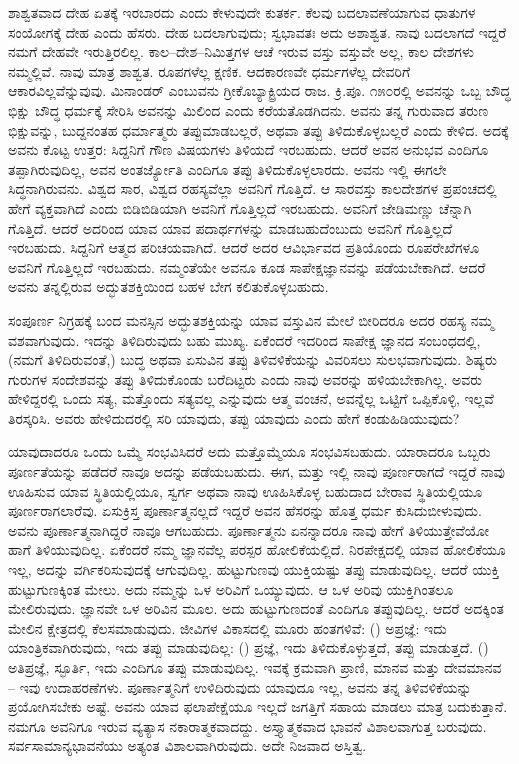 ಶಾಶ್ವತವಾದ ದೇಹ ಏತಕ್ಕೆ ಇರಬಾರದು ಎಂದು ಕೇಳುವುದೇ ಕುತರ್ಕ. ಕೆಲವು ಬದಲಾವಣೆಯಾಗುವ ಧಾತುಗಳ ಸಂಯೋಗಕ್ಕೆ ದೇಹ ಎಂದು ಹೆಸರು. ದೇಹ ಬದಲಾಗುವುದು; ಸ್ವಭಾವತಃ ಅದು ಅಶಾಶ್ವತ. ನಾವು ಬದಲಾಗದೆ ಇದ್ದರೆ ನಮಗೆ ದೇಹವೇ ಇರುತ್ತಿರಲಿಲ್ಲ. ಕಾಲ–ದೇಶ–ನಿಮಿತ್ತಗಳ ಆಚೆ ಇರುವ ವಸ್ತು ವಸ್ತುವೇ ಅಲ್ಲ, ಕಾಲ ದೇಶಗಳು ನಮ್ಮಲ್ಲಿವೆ. ನಾವು ಮಾತ್ರ ಶಾಶ್ವತ. ರೂಪಗಳೆಲ್ಲ ಕ್ಷಣಿಕ. ಆದಕಾರಣವೇ ಧರ್ಮಗಳೆಲ್ಲ ದೇವರಿಗೆ ಆಕಾರವಿಲ್ಲವೆನ್ನುವುವು. ಮಿನಾಂಡರ್ ಎಂಬುವನು ಗ್ರೀಕೊಬ್ಯಾಕ್ಟ್ರಿಯದ ರಾಜ. ಕ್ರಿ.ಪೂ. ೧೫೦ರಲ್ಲಿ ಅವನನ್ನು ಒಬ್ಬ ಬೌದ್ಧ ಭಿಕ್ಷು ಬೌದ್ಧ ಧರ್ಮಕ್ಕೆ ಸೇರಿಸಿ ಅವನನ್ನು ಮಿಲಿಂದ ಎಂದು ಕರೆಯತೊಡಗಿದನು. ಅವನು ತನ್ನ ಗುರುವಾದ ತರುಣ ಭಿಕ್ಷುವನ್ನು, ಬುದ್ದನಂತಹ ಧರ್ಮಾತ್ಮರು ತಪ್ಪುಮಾಡಬಲ್ಲರೆ, ಅಥವಾ ತಪ್ಪು ತಿಳಿದುಕೊಳ್ಳಬಲ್ಲರೆ ಎಂದು ಕೇಳಿದ. ಅದಕ್ಕೆ ಅವನು ಕೊಟ್ಟ ಉತ್ತರ: ಸಿದ್ದನಿಗೆ ಗೌಣ ವಿಷಯಗಳು ತಿಳಿಯದೆ ಇರಬಹುದು. ಆದರೆ ಅವನ ಅನುಭವ ಎಂದಿಗೂ ತಪ್ಪಾಗಿರುವುದಿಲ್ಲ, ಅವನ ಅಂತರ್ಜ್ಯೋತಿ ಎಂದಿಗೂ ತಪ್ಪು ತಿಳಿದುಕೊಳ್ಳಲಾರದು. ಅವನು ಇಲ್ಲಿ ಈಗಲೇ ಸಿದ್ಧನಾಗಿರುವನು. ವಿಶ್ವದ ಸಾರ, ವಿಶ್ವದ ರಹಸ್ಯವೆಲ್ಲಾ ಅವನಿಗೆ ಗೊತ್ತಿದೆ. ಆ ಸಾರವಸ್ತು ಕಾಲದೇಶಗಳ ಪ್ರಪಂಚದಲ್ಲಿ ಹೇಗೆ ವ್ಯಕ್ತವಾಗಿದೆ ಎಂದು ಬಿಡಿಬಿಡಿಯಾಗಿ ಅವನಿಗೆ ಗೊತ್ತಿಲ್ಲದೆ ಇರಬಹುದು. ಅವನಿಗೆ ಜೇಡಿಮಣ್ಣು ಚೆನ್ನಾಗಿ ಗೊತ್ತಿದೆ. ಆದರೆ ಅದರಿಂದ ಯಾವ ಯಾವ ಪದಾರ್ಥಗಳನ್ನು ಮಾಡಬಹುದೆಂಬುದು ಅವನಿಗೆ ಗೊತ್ತಿಲ್ಲದೆ ಇರಬಹುದು. ಸಿದ್ದನಿಗೆ ಆತ್ಮದ ಪರಿಚಯವಾಗಿದೆ. ಆದರೆ ಅದರ ಆವಿರ್ಭಾವದ ಪ್ರತಿಯೊಂದು ರೂಪರೇಖೆಗಳೂ ಅವನಿಗೆ ಗೊತ್ತಿಲ್ಲದೆ ಇರಬಹುದು. ನಮ್ಮಂತೆಯೇ ಅವನೂ ಕೂಡ ಸಾಪೇಕ್ಷಜ್ಞಾನವನ್ನು ಪಡೆಯಬೇಕಾಗಿದೆ. ಆದರೆ ಅವನು ತನ್ನಲ್ಲಿರುವ ಅದ್ಭುತಶಕ್ತಿಯಿಂದ ಬಹಳ ಬೇಗ ಕಲಿತುಕೊಳ್ಳಬಹುದು.

ಸಂಪೂರ್ಣ ನಿಗ್ರಹಕ್ಕೆ ಬಂದ ಮನಸ್ಸಿನ ಅದ್ಭುತಶಕ್ತಿಯನ್ನು ಯಾವ ವಸ್ತುವಿನ ಮೇಲೆ ಬೀರಿದರೂ ಅದರ ರಹಸ್ಯ ನಮ್ಮ ವಶವಾಗುವುದು. ಇದನ್ನು ತಿಳಿದಿರುವುದು ಬಹು ಮುಖ್ಯ. ಏಕೆಂದರೆ ಇದರಿಂದ ಸಾಪೇಕ್ಷ ಜ್ಞಾನದ ಸಂಬಂಧದಲ್ಲಿ, (ನಮಗೆ ತಿಳಿದಿರುವಂತೆ,) ಬುದ್ಧ ಅಥವಾ ಏಸುವಿನ ತಪ್ಪು ತಿಳಿವಳಿಕೆಯನ್ನು ವಿವರಿಸಲು ಸುಲಭವಾಗುವುದು. ಶಿಷ್ಯರು ಗುರುಗಳ ಸಂದೇಶವನ್ನು ತಪ್ಪು ತಿಳಿದುಕೊಂಡು ಬರೆದಿಟ್ಟರು ಎಂದು ನಾವು ಅವರನ್ನು ಹಳಿಯಬೇಕಾಗಿಲ್ಲ. ಅವರು ಹೇಳಿದ್ದರಲ್ಲಿ ಒಂದು ಸತ್ಯ, ಮತ್ತೊಂದು ಸತ್ಯವಲ್ಲ ಎನ್ನುವುದು ಆತ್ಮ ವಂಚನೆ, ಅವನ್ನೆಲ್ಲ ಒಟ್ಟಿಗೆ ಒಪ್ಪಿಕೊಳ್ಳಿ, ಇಲ್ಲವೆ ತಿರಸ್ಕರಿಸಿ. ಅವರು ಹೇಳಿದುದರಲ್ಲಿ ಸರಿ ಯಾವುದು, ತಪ್ಪು ಯಾವುದು ಎಂದು ಹೇಗೆ ಕಂಡುಹಿಡಿಯುವುದು?

ಯಾವುದಾದರೂ ಒಂದು ಒಮ್ಮೆ ಸಂಭವಿಸಿದರೆ ಅದು ಮತ್ತೊಮ್ಮೆಯೂ ಸಂಭವಿಸಬಹುದು. ಯಾರಾದರೂ ಒಬ್ಬರು ಪೂರ್ಣತೆಯನ್ನು ಪಡೆದರೆ ನಾವೂ ಅದನ್ನು ಪಡೆಯಬಹುದು. ಈಗ, ಮತ್ತು ಇಲ್ಲಿ ನಾವು ಪೂರ್ಣರಾಗದೆ ಇದ್ದರೆ ನಾವು ಊಹಿಸುವ ಯಾವ ಸ್ಥಿತಿಯಲ್ಲಿಯೂ, ಸ್ವರ್ಗ ಅಥವಾ ನಾವು ಊಹಿಸಿಕೊಳ್ಳ ಬಹುದಾದ ಬೇರಾವ ಸ್ಥಿತಿಯಲ್ಲಿಯೂ ಪೂರ್ಣರಾಗಲಾರೆವು. ಏಸುಕ್ರಿಸ್ತ ಪೂರ್ಣಾತ್ಮನಲ್ಲದೆ ಇದ್ದರೆ ಅವನ ಹೆಸರನ್ನು ಹೊತ್ತ ಧರ್ಮ ಕುಸಿದುಬೀಳುವುದು. ಅವನು ಪೂರ್ಣಾತ್ಮನಾಗಿದ್ದರೆ ನಾವೂ ಆಗಬಹುದು. ಪೂರ್ಣಾತ್ಮನು ಏನನ್ನಾದರೂ ನಾವು ಹೇಗೆ ತಿಳಿಯುತ್ತೇವೆಯೋ ಹಾಗೆ ತಿಳಿಯುವುದಿಲ್ಲ. ಏಕೆಂದರೆ ನಮ್ಮ ಜ್ಞಾನವೆಲ್ಲ ಪರಸ್ಪರ ಹೋಲಿಕೆಯಲ್ಲಿದೆ. ನಿರಪೇಕ್ಷದಲ್ಲಿ ಯಾವ ಹೋಲಿಕೆಯೂ ಇಲ್ಲ, ಅದನ್ನು ವರ್ಗಿಕರಿಸುವುದಕ್ಕೆ ಆಗುವುದಿಲ್ಲ. ಹುಟ್ಟುಗುಣವು ಯುಕ್ತಿಯಷ್ಟು ತಪ್ಪು ಮಾಡುವುದಿಲ್ಲ. ಆದರೆ ಯುಕ್ತಿ ಹುಟ್ಟುಗುಣಕ್ಕಿಂತ ಮೇಲು. ಅದು ನಮ್ಮನ್ನು ಒಳ ಅರಿವಿಗೆ ಒಯ್ಯುವುದು. ಆ ಒಳ ಅರಿವು ಯುಕ್ತಿಗಿಂತಲೂ ಮೇಲಿರುವುದು. ಜ್ಞಾನವೇ ಒಳ ಅರಿವಿನ ಮೂಲ. ಅದು ಹುಟ್ಟುಗುಣದಂತೆ ಎಂದಿಗೂ ತಪ್ಪುವುದಿಲ್ಲ. ಆದರೆ ಅದಕ್ಕಿಂತ ಮೇಲಿನ ಕ್ಷೇತ್ರದಲ್ಲಿ ಕೆಲಸಮಾಡುವುದು. ಜೀವಿಗಳ ವಿಕಾಸದಲ್ಲಿ ಮೂರು ಹಂತಗಳಿವೆ: () ಅಪ್ರಜ್ಞೆ: ಇದು ಯಾಂತ್ರಿಕವಾಗಿರುವುದು, ಇದು ತಪ್ಪು ಮಾಡುವುದಿಲ್ಲ: () ಪ್ರಜ್ಞೆ, ಇದು ತಿಳಿದುಕೊಳ್ಳುತ್ತದೆ, ತಪ್ಪು ಮಾಡುತ್ತದೆ. () ಅತಿಪ್ರಜ್ಞೆ, ಸ್ಫೂರ್ತಿ, ಇದು ಎಂದಿಗೂ ತಪ್ಪು ಮಾಡುವುದಿಲ್ಲ. ಇವಕ್ಕೆ ಕ್ರಮವಾಗಿ ಪ್ರಾಣಿ, ಮಾನವ ಮತ್ತು ದೇವಮಾನವ – ಇವು ಉದಾಹರಣೆಗಳು. ಪೂರ್ಣಾತ್ಮನಿಗೆ ಉಳಿದಿರುವುದು ಯಾವುದೂ ಇಲ್ಲ, ಅವನು ತನ್ನ ತಿಳಿವಳಿಕೆಯನ್ನು ಪ್ರಯೋಗಿಸಬೇಕು ಅಷ್ಟೆ. ಅವನು ಯಾವ ಫಲಾಪೇಕ್ಷೆಯೂ ಇಲ್ಲದೆ ಜಗತ್ತಿಗೆ ಸಹಾಯ ಮಾಡಲು ಮಾತ್ರ ಬದುಕುತ್ತಾನೆ. ನಮಗೂ ಅವನಿಗೂ ಇರುವ ವ್ಯತ್ಯಾಸ ನಕಾರಾತ್ಮಕವಾದದ್ದು. ಅಸ್ತ್ಯಾತ್ಮಕವಾದ ಭಾವನೆ ವಿಶಾಲವಾಗುತ್ತ ಬರುವುದು. ಸರ್ವಸಾಮಾನ್ಯಭಾವನೆಯು ಅತ್ಯಂತ ವಿಶಾಲವಾಗಿರುವುದು. ಅದೇ ನಿಜವಾದ ಅಸ್ತಿತ್ವ.

